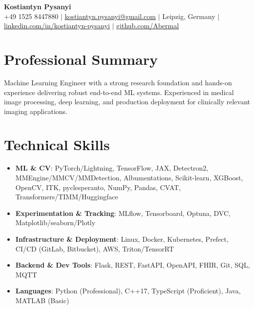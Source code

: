 \documentclass[letterpaper,10pt]{article}
\newcommand{\resumeItem}[1]{
    \item\small{#1}\vspace{-0.5pt}
}
\newcommand{\resumeSubHeadingList}{\begin{itemize}[leftmargin=0.15in, label={}]\vspace{-2pt}}
\newcommand{\resumeSubHeadingListEnd}{\end{itemize}}
\begin{document}
\begin{center}
  \textbf{\Huge Kostiantyn Pysanyi}\vspace{4pt} \\
  \small +49 1525 8447880 $|$ \href{mailto:kostiantyn.pysanyi@gmail.com}{kostiantyn.pysanyi@gmail.com} $|$ Leipzig, Germany $|$
  \href{https://www.linkedin.com/in/kostiantyn-pysanyi/}{linkedin.com/in/kostiantyn-pysanyi} $|$ \href{https://github.com/Abermal}{github.com/Abermal}
\end{center}




\section{Professional Summary}
Machine Learning Engineer with a strong research foundation and hands-on experience delivering robust end-to-end ML systems. Experienced in medical image processing, deep learning, and production deployment for clinically relevant imaging applications.

\section{Technical Skills}
\resumeSubHeadingList
  \resumeItem{\textbf{ML \& CV}: PyTorch/Lightning, TensorFlow, JAX, Detectron2, MMEngine/MMCV/MMDetection, Albumentations, Scikit-learn, XGBoost, OpenCV, ITK, pyclesperanto, NumPy, Pandas, CVAT, Transformers/TIMM/Huggingface}
  \resumeItem{\textbf{Experimentation \& Tracking}: MLflow, Tensorboard, Optuna, DVC, Matplotlib/seaborn/Plotly}
  \resumeItem{\textbf{Infrastructure \& Deployment}: Linux, Docker, Kubernetes, Prefect, CI/CD (GitLab, Bitbucket), AWS, Triton/TensorRT}
  \resumeItem{\textbf{Backend \& Dev Tools}: Flask, REST, FastAPI, OpenAPI, FHIR, Git, SQL, MQTT}
  \resumeItem{\textbf{Languages}: Python (Professional), C++17, TypeScript (Proficient), Java, MATLAB (Basic)}
\resumeSubHeadingListEnd
\end{document}
